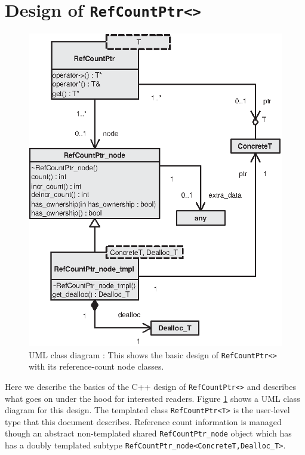 %
\section{Design of \texttt{RefCountPtr<>}}
\label{rcp:apdx:design}
%

{\bsinglespace
\begin{figure}
\begin{center}
\includegraphics*[bb= 0.0in 0.0in 4.1in 4.9in,scale=1.0
]{RefCountPtrClassDiagram}
\end{center}
{}\caption{ {}\label{rcp:fig:rcp-class-diagram} UML class diagram :
This shows the basic design of {}\texttt{RefCountPtr<>} with its
reference-count node classes.  }
\end{figure}
\esinglespace}

Here we describe the basics of the C++ design of
{}\texttt{RefCountPtr<>} and describes what goes on under the hood for
interested readers.  Figure {}\ref{rcp:fig:rcp-class-diagram} shows a
UML class diagram for this design.  The templated class
{}\texttt{RefCountPtr<T>} is the user-level type that this document
describes.  Reference count information is managed though an abstract
non-templated shared {}\texttt{RefCountPtr\-\_node} object which has
has a doubly templated subtype
{}\texttt{RefCountPtr\-\_node<ConcreteT,Dealloc\_T>}.

